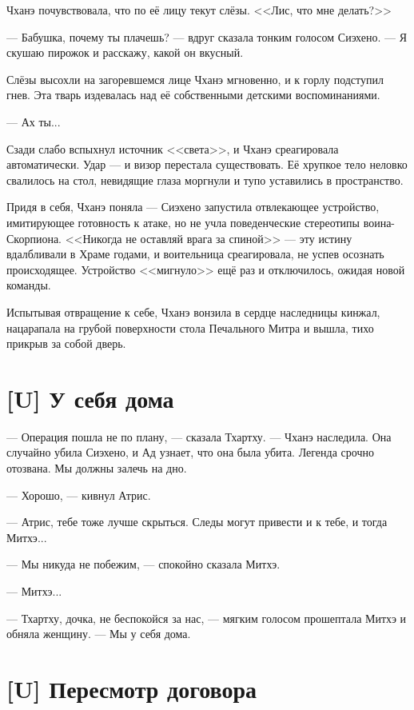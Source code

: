 \textspace

Чханэ почувствовала, что по её лицу текут слёзы.
<<Лис, что мне делать?>>

--- Бабушка, почему ты плачешь? --- вдруг сказала тонким голосом Сиэхено.
--- Я скушаю пирожок и расскажу, какой он вкусный.

Слёзы высохли на загоревшемся лице Чханэ мгновенно, и к горлу подступил гнев.
Эта тварь издевалась над её собственными детскими воспоминаниями.

--- Ах ты...

Сзади слабо вспыхнул источник <<света>>, и Чханэ среагировала автоматически.
Удар --- и визор перестала существовать.
Её хрупкое тело неловко свалилось на стол, невидящие глаза моргнули и тупо уставились в пространство.

Придя в себя, Чханэ поняла --- Сиэхено запустила отвлекающее устройство, имитирующее готовность к атаке, но не учла поведенческие стереотипы воина-Скорпиона.
<<Никогда не оставляй врага за спиной>> --- эту истину вдалбливали в Храме годами, и воительница среагировала, не успев осознать происходящее.
Устройство <<мигнуло>> ещё раз и отключилось, ожидая новой команды.

Испытывая отвращение к себе, Чханэ вонзила в сердце наследницы кинжал, нацарапала на грубой поверхности стола Печального Митра и вышла, тихо прикрыв за собой дверь.

\section{[U] У себя дома}

\textspace

--- Операция пошла не по плану, --- сказала Тхартху.
--- Чханэ наследила.
Она случайно убила Сиэхено, и Ад узнает, что она была убита.
Легенда срочно отозвана.
Мы должны залечь на дно.

--- Хорошо, --- кивнул Атрис.

--- Атрис, тебе тоже лучше скрыться.
Следы могут привести и к тебе, и тогда Митхэ...

--- Мы никуда не побежим, --- спокойно сказала Митхэ.

--- Митхэ...

--- Тхартху, дочка, не беспокойся за нас, --- мягким голосом прошептала Митхэ и обняла женщину.
--- Мы у себя дома.

\section{[U] Пересмотр договора}

